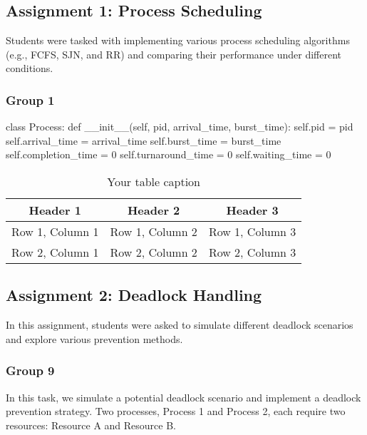 \documentclass[12pt]{article}
\begin{document}
\subsection{Assignment 1: Process Scheduling}
Students were tasked with implementing various process scheduling algorithms (e.g., FCFS, SJN, and RR) and comparing their performance under different conditions.
\subsubsection{Group 1}
\begin{python}
    class Process:
    def __init__(self, pid, arrival_time, burst_time):
        self.pid = pid
        self.arrival_time = arrival_time
        self.burst_time = burst_time
        self.completion_time = 0
        self.turnaround_time = 0
        self.waiting_time = 0
\end{python}

\begin{table}[htbp] %
    \centering
    \begin{tabular}{|c|c|c|} %
    \hline
    Header 1 & Header 2 & Header 3 \\ %
    \hline
    Row 1, Column 1 & Row 1, Column 2 & Row 1, Column 3 \\ %
    \hline
    Row 2, Column 1 & Row 2, Column 2 & Row 2, Column 3 \\ %
    \hline
    \end{tabular}
    \caption{Your table caption} %
    \label{tab:your_label} %
\end{table}
\subsection{Assignment 2: Deadlock Handling}
In this assignment, students were asked to simulate different deadlock scenarios and explore various prevention methods.
\subsubsection{Group 9}

In this task, we simulate a potential deadlock scenario and implement a deadlock prevention strategy. Two processes, Process 1 and Process 2, each require two resources: Resource A and Resource B.
\end{document}
